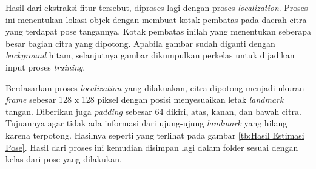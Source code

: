 Hasil dari ekstraksi fitur tersebut, diproses lagi dengan proses \emph{localization}. Proses ini menentukan lokasi objek dengan membuat kotak pembatas pada daerah citra yang terdapat pose tangannya. Kotak pembatas inilah yang menentukan seberapa besar bagian citra yang dipotong. Apabila gambar sudah diganti dengan \emph{background} hitam, selanjutnya gambar dikumpulkan perkelas untuk dijadikan input proses \emph{training}.

Berdasarkan proses \emph{localization} yang dilakuakan, citra dipotong menjadi ukuran \emph{frame} sebesar 128 x 128 piksel dengan posisi menyesuaikan letak \emph{landmark} tangan. Diberikan juga \emph{padding} sebesar 64 dikiri, atas, kanan, dan bawah citra. Tujuannya agar tidak ada informasi dari ujung-ujung \emph{landmark} yang hilang karena terpotong. Hasilnya seperti yang terlihat pada gambar \ref{tb:Hasil Estimasi Pose}. Hasil dari proses ini kemudian disimpan lagi dalam folder sesuai dengan kelas dari pose yang dilakukan.

